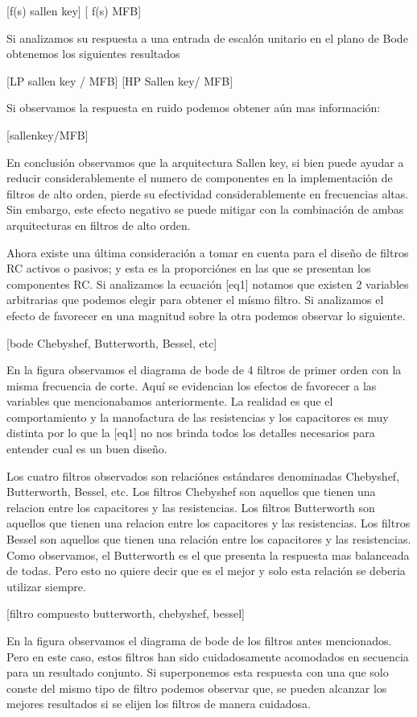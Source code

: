 [f(s) sallen key] [ f(s) MFB]

Si analizamos su respuesta a una entrada de escalón unitario en el plano de Bode obtenemos los siguientes resultados

[LP sallen key / MFB]
[HP Sallen key/ MFB]

Si observamos la respuesta en ruido podemos obtener aún mas información: 

[sallenkey/MFB]

En conclusión observamos que la arquitectura Sallen key, si bien puede ayudar a reducir considerablemente el numero de componentes en la implementación de filtros de alto orden, pierde su efectividad considerablemente en frecuencias altas. Sin embargo, este efecto negativo se puede mitigar con la combinación de ambas arquitecturas en filtros de alto orden.

Ahora existe una última consideración a tomar en cuenta para el diseño de filtros RC activos o pasivos; y esta es la proporciónes en las que se presentan los componentes RC. Si analizamos la ecuación [eq1] notamos que existen 2 variables arbitrarias que podemos elegir para obtener el mísmo filtro. Si analizamos el efecto de favorecer en una magnitud sobre la otra podemos observar lo siguiente.

[bode Chebyshef, Butterworth, Bessel, etc]

En la figura observamos el diagrama de bode de 4 filtros de primer orden con la misma frecuencia de corte. Aquí se evidencian los efectos de favorecer a las variables que mencionabamos anteriormente. La realidad es que el comportamiento y la manofactura de las resistencias y los capacitores es muy distinta por lo que la [eq1] no nos brinda todos los detalles necesarios para entender cual es un buen diseño.

Los cuatro filtros observados son relaciónes estándares denominadas Chebyshef, Butterworth, Bessel, etc. Los filtros Chebyshef son aquellos que tienen una relacion entre los capacitores y las resistencias. Los filtros Butterworth son aquellos que tienen una relacion entre los capacitores y las resistencias. Los filtros Bessel son aquellos que tienen una relación entre los capacitores y las resistencias. Como observamos, el Butterworth es el que presenta la respuesta mas balanceada de todas. Pero esto no quiere decir que es el mejor y solo esta relación se deberia utilizar siempre.

[filtro compuesto butterworth, chebyshef, bessel]

En la figura observamos el diagrama de bode de los filtros antes mencionados. Pero en este caso, estos filtros han sido cuidadosamente acomodados en secuencia para un resultado conjunto. Si superponemos esta respuesta con una que solo conste del mismo tipo de filtro podemos observar que, se pueden alcanzar los mejores resultados si se elijen los filtros de manera cuidadosa.

